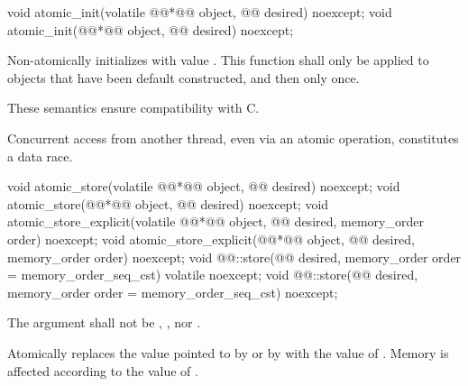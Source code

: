 \begin{itemdecl}
void atomic_init(volatile @@*@\itcorr[-1]@ object, @@ desired) noexcept;
void atomic_init(@@*@\itcorr[-1]@ object, @@ desired) noexcept;
\end{itemdecl}

\begin{itemdescr}
\pnum
\effects Non-atomically
initializes  with value . This function shall only be applied
to objects that have been default constructed, and then only once.
\begin{note}
These semantics ensure compatibility with C.
\end{note}
\begin{note}
Concurrent access from another thread, even via an atomic operation, constitutes
a data race.
\end{note}

\end{itemdescr}

%
%
%
%
%
%
\begin{itemdecl}
void atomic_store(volatile @@*@\itcorr[-1]@ object, @@ desired) noexcept;
void atomic_store(@@*@\itcorr[-1]@ object, @@ desired) noexcept;
void atomic_store_explicit(volatile @@*@\itcorr[-1]@ object, @@ desired, memory_order order) noexcept;
void atomic_store_explicit(@@*@\itcorr[-1]@ object, @@ desired, memory_order order) noexcept;
void @@::store(@@ desired, memory_order order = memory_order_seq_cst) volatile noexcept;
void @@::store(@@ desired, memory_order order = memory_order_seq_cst) noexcept;
\end{itemdecl}

\begin{itemdescr}
\pnum
\requires The  argument shall not be ,
, nor .

\pnum
\effects Atomically replaces the value pointed to by  or by 
with the value of . Memory is affected according to the value of
.
\end{itemdescr}

